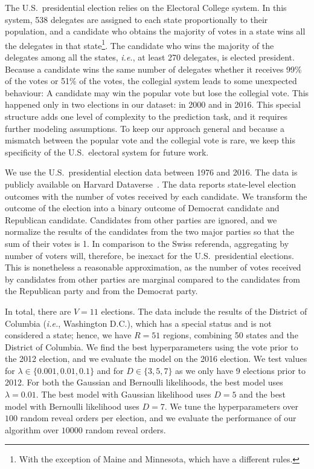 The U.S.\ presidential election relies on the Electoral College system.
In this system, 538 delegates are assigned to each state proportionally to their population, and a candidate who obtains the majority of votes in a state wins all the delegates in that state\footnote{With the exception of Maine and Minnesota, which have a different rules.}.
The candidate who wins the majority of the delegates among all the states, \textit{i.e.}, at least 270 delegates, is elected president.
Because a candidate wins the same number of delegates whether it receives 99\% of the votes or 51\% of the votes, the collegial system leads to some unexpected behaviour: A candidate may win the popular vote but lose the collegial vote.
This happened only in two elections in our dataset: in 2000 and in 2016.
This special structure adds one level of complexity to the prediction task, and it requires further modeling assumptions.
To keep our approach general and because a mismatch between the popular vote and the collegial vote is rare, we keep this specificity of the U.S.\ electoral system for future work.

We use the U.S.\ presidential election data between 1976 and 2016.
The data is publicly available on Harvard Dataverse~\cite{mit2017us}.
The data reports state-level election outcomes with the number of votes received by each candidate.
We transform the outcome of the election into a binary outcome of Democrat candidate and Republican candidate.
Candidates from other parties are ignored, and we normalize the results of the candidates from the two major parties so that the sum of their votes is 1.
In comparison to the Swiss referenda, aggregating by number of voters will, therefore, be inexact for the U.S.\ presidential elections.
This is nonetheless a reasonable approximation, as the number of votes received by candidates from other parties are marginal compared to the candidates from the Republican party and from the Democrat party.

In total, there are $V=11$ elections.
The data include the results of the District of Columbia (\textit{i.e.}, Washington D.C.), which has a special status and is not considered a state; hence, we have $R=51$ regions, combining 50 states and the District of Columbia.
We find the best hyperparameters using the vote prior to the 2012 election, and we evaluate the model on the 2016 election.
We test values for $\lambda \in \{0.001, 0.01, 0.1 \}$ and for $D \in \{3, 5, 7\}$ as we only have 9 elections prior to 2012.
For both the Gaussian and Bernoulli likelihoods, the best model uses $\lambda = 0.01$.
The best model with Gaussian likelihood uses $D=5$ and the best model with Bernoulli likelihood uses $D=7$.
We tune the hyperparameters over $100$ random reveal orders per election, and we evaluate the performance of our algorithm over $10000$ random reveal orders.

